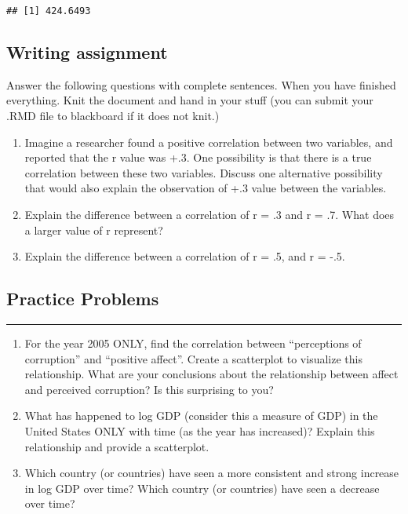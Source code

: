 \documentclass[
]{book}
\begin{document}
\begin{verbatim}
## [1] 424.6493
\end{verbatim}

\hypertarget{writing-assignment-2}{%
\subsection{Writing assignment}\label{writing-assignment-2}}

Answer the following questions with complete sentences. When you have finished everything. Knit the document and hand in your stuff (you can submit your .RMD file to blackboard if it does not knit.)

\begin{enumerate}
\def\labelenumi{\arabic{enumi}.}
\item
  Imagine a researcher found a positive correlation between two variables, and reported that the r value was +.3. One possibility is that there is a true correlation between these two variables. Discuss one alternative possibility that would also explain the observation of +.3 value between the variables.
\item
  Explain the difference between a correlation of r = .3 and r = .7. What does a larger value of r represent?
\item
  Explain the difference between a correlation of r = .5, and r = -.5.
\end{enumerate}

\hypertarget{practice-problems-1}{%
\subsection{Practice Problems}\label{practice-problems-1}}

\begin{center}\rule{0.5\linewidth}{0.5pt}\end{center}

\begin{enumerate}
\def\labelenumi{\arabic{enumi}.}
\item
  For the year 2005 ONLY, find the correlation between ``perceptions of corruption'' and ``positive affect''. Create a scatterplot to visualize this relationship. What are your conclusions about the relationship between affect and perceived corruption? Is this surprising to you?
\item
  What has happened to log GDP (consider this a measure of GDP) in the United States ONLY with time (as the year has increased)? Explain this relationship and provide a scatterplot.
\item
  Which country (or countries) have seen a more consistent and strong increase in log GDP over time? Which country (or countries) have seen a decrease over time?
\end{enumerate}
\end{document}
